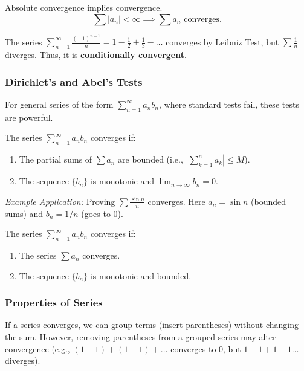 \begin{theorem}
Absolute convergence implies convergence.
\[ \sum |a_n| < \infty \implies \sum a_n \text{ converges}. \]
\end{theorem}

\begin{example}
The series $\sum_{n=1}^{\infty} \frac{(-1)^{n-1}}{n} = 1 - \frac{1}{2} + \frac{1}{3} - \dots$ converges by Leibniz Test, but $\sum \frac{1}{n}$ diverges. Thus, it is \textbf{conditionally convergent}.
\end{example}

\subsubsection{Dirichlet's and Abel's Tests}
For general series of the form $\sum_{n=1}^{\infty} a_n b_n$, where standard tests fail, these tests are powerful.

\begin{theorem}
The series $\sum_{n=1}^{\infty} a_n b_n$ converges if:
\begin{enumerate}
    \item The partial sums of $\sum a_n$ are bounded (i.e., $|\sum_{k=1}^n a_k| \le M$).
    \item The sequence $\{b_n\}$ is monotonic and $\lim_{n \to \infty} b_n = 0$.
\end{enumerate}
\end{theorem}
\textit{Example Application:} Proving $\sum \frac{\sin n}{n}$ converges. Here $a_n = \sin n$ (bounded sums) and $b_n = 1/n$ (goes to 0).

\begin{theorem}
The series $\sum_{n=1}^{\infty} a_n b_n$ converges if:
\begin{enumerate}
    \item The series $\sum a_n$ converges.
    \item The sequence $\{b_n\}$ is monotonic and bounded.
\end{enumerate}
\end{theorem}

\subsubsection{Properties of Series}

\begin{theorem}[Associativity]
If a series converges, we can group terms (insert parentheses) without changing the sum. However, removing parentheses from a grouped series may alter convergence (e.g., $(1-1)+(1-1)+\dots$ converges to 0, but $1-1+1-1\dots$ diverges).
\end{theorem}


